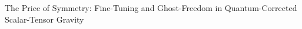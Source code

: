 \documentclass[twocolumn]{aastex631}
\begin{document}
The Price of Symmetry: Fine-Tuning and Ghost-Freedom in Quantum-Corrected Scalar-Tensor Gravity
\end{document}
